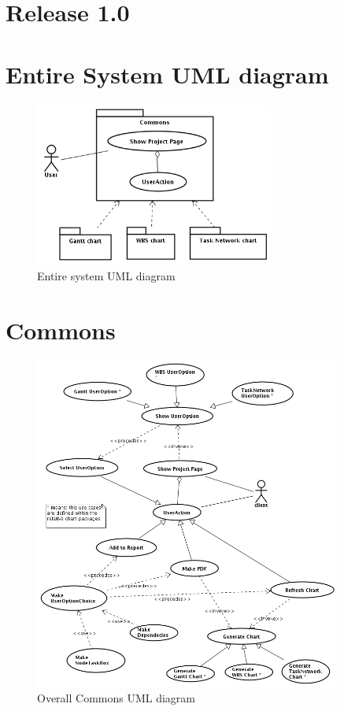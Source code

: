 \chapter*{Release \textbf{1.0}}

\chapter{Entire System UML diagram}
\begin{figure}[h!] \centering
\includegraphics[width=0.7\textwidth]{../Milestone2-UseCases/EntireSystem.png} 
\caption{Entire system UML diagram}
\label{fig:entireSystemDiagram}
\end{figure}

\chapter{Commons}
\begin{figure}[h!] \centering
\includegraphics[width=0.9\textwidth]{../Milestone2-UseCases/Commons/img/Overall.png}
\caption{Overall Commons UML diagram}
\label{fig:commonsOverallDiagram}
\end{figure}

